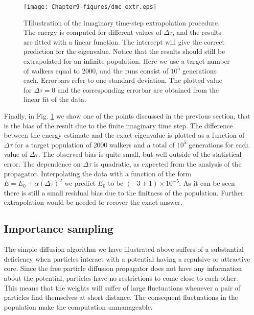\begin{figure}
	\begin{center}
		\texttt{[image: Chapter9-figures/dmc\_extr.eps]}
	\end{center}
	\caption{TIllustration of the imaginary time-step extrapolation procedure. The energy is computed for different values of $\Delta\tau$, and the results are fitted with a linear function. The intercept will give the correct prediction for the eigenvalue. Notice that the results should still be extrapolated for an infinite population. Here we use a target number of walkers equal to 2000, and the runs consist of $10^5$ generations each. Errorbars refer to one standard deviation. The plotted value for $\Delta\tau=0$ and the corresponding errorbar are obtained from the linear fit of the data. }
	\label{fig.extr}
\end{figure}

Finally, in Fig. \ref{fig.extr} we show one of the points discussed in the previous section, that is the bias of the result due to the finite imaginary time step. The difference between the energy estimate and the exact eigenvalue is plotted as a function of $\Delta\tau$ for a target population of 2000 walkers and a total of $10^5$ generations for each value of $\Delta\tau$. The observed bias is quite small, but well outside of the statistical error. The dependence on $\Delta\tau$ is quadratic, as expected from the analysis of the propagator. Interpolating the data with a function of the form $E=E_0+\alpha(\Delta\tau)^2$ we predict $E_0$ to be  $(-3\pm1)\times 10^{-5}$. As it can be seen there is still a small residual bias due to the finitness of the population. Further extrapolation would be needed to recover the exact answer. 
 
\subsection{Importance sampling}
The simple diffusion algorithm we have illustrated above suffers of a substantial deficiency when particles interact with a potential having a repulsive or attractive core. Since the free particle diffusion propagator does not have any information about the potential, particles have no restrictions to come close to each other. This means that the weights will suffer of large fluctuations whenever a pair of particles find themselves at short distance. The consequent fluctuations in the population make the computation unmanageable.  

